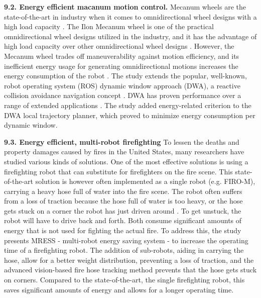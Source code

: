 \vspace{2mm} \noindent \textbf{9.2. Energy efficient macanum motion control.}
Mecanum wheels are the state-of-the-art in industry when it comes to omnidirectional wheel designs with a high load capacity \cite{xie2018mecanum_wheel}.
The Ilon Mecanum wheel is one of the practical omnidirectional wheel designs utilized in the industry, 
and it has the advantage of high load capacity over other omnidirectional wheel designs \cite{adascalitei2011mecanum_wheels}.
However, the Mecanum wheel trades off maneuverability against motion efficiency, and its inefficient energy usage for generating omnidirectional 
motions increases the energy consumption of the robot \cite{diegel2002improved_mecanum_wheel}.
The study extends the popular, well-known, robot operating system (ROS) dynamic window approach (DWA),
a reactive collision avoidance navigation concept \cite{fox1997dwa_paper}.
DWA has proven performance over a range of extended applications \cite{brock1999dwa_usage_1,ogren2005dwa_usage_2,kiss2012dwa_usage_3}.
The study added energy-related criterion to the DWA local trajectory planner,
which proved to minimize energy consumption per dynamic window.

\vspace{2mm} \noindent \textbf{9.3. Energy efficient, multi-robot firefighting}
To lessen the deaths \cite{fahy2015firefighter_deaths} and property damages \cite{karter2013fire_damages} 
caused by fires in the United States, many researchers have studied various kinds of solutions. 
One of the most effective solutions is using a firefighting robot that can 
substitute for firefighters on the fire scene. This state-of-the-art solution
is however often implemented as a single robot (e.g. FIRO-M), 
carrying a heavy hose full of water into the fire scene.
The robot often suffers from a loss of traction because the hose full of water
is too heavy, or the hose gets stuck on a corner the robot has just driven around \cite{kim2016firefighting_robot}.
To get unstuck, the robot will have to drive back and forth. 
Both consume significant amounts of energy that is not used for fighting the actual fire.
To address this, the study presents MRESS - multi-robot energy saving system - to increase
the operating time of a firefighting robot.
The addition of sub-robots, aiding in carrying the hose, 
allow for a better weight distribution, preventing a loss of traction, 
and the advanced vision-based fire hose tracking method prevents 
that the hose gets stuck on corners.
Compared to the state-of-the-art, the single firefighting robot, 
this saves significant amounts of energy and allows for a longer operating time.

